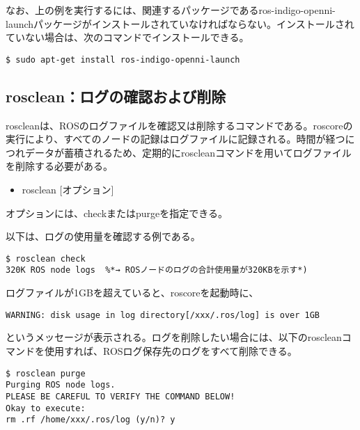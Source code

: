 なお、上の例を実行するには、関連するパッケージであるros-indigo-openni-launchパッケージがインストールされていなければならない。インストールされていない場合は、次のコマンドでインストールできる。

\begin{lstlisting}[language=ROS]
$ sudo apt-get install ros-indigo-openni-launch
\end{lstlisting}

\subsection{rosclean：ログの確認および削除}

roscleanは、ROSのログファイルを確認又は削除するコマンドである。roscoreの実行により、すべてのノードの記録はログファイルに記録される。時間が経つにつれデータが蓄積されるため、定期的にroscleanコマンドを用いてログファイルを削除する必要がある。\\

\begin{itemize}
\item  rosclean [オプション]\\
\end{itemize}
オプションには、checkまたはpurgeを指定できる。

以下は、ログの使用量を確認する例である。

\begin{lstlisting}[language=ROS]
$ rosclean check
320K ROS node logs  %*→ ROSノードのログの合計使用量が320KBを示す*)
\end{lstlisting}

ログファイルが1GBを超えていると、roscoreを起動時に、

\begin{lstlisting}[language=ROS]
WARNING: disk usage in log directory[/xxx/.ros/log] is over 1GB
\end{lstlisting}

というメッセージが表示される。ログを削除したい場合には、以下のroscleanコマンドを使用すれば、ROSログ保存先のログをすべて削除できる。

\begin{lstlisting}[language=ROS]
$ rosclean purge
Purging ROS node logs.
PLEASE BE CAREFUL TO VERIFY THE COMMAND BELOW!
Okay to execute:
rm .rf /home/xxx/.ros/log (y/n)? y
\end{lstlisting}

